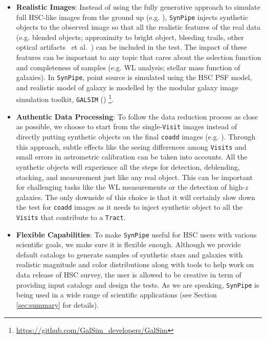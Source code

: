 \documentclass[useamsfonts]{pasj01}
\def\etal{{\ et al.~}}
\def\synpipe{\texttt{SynPipe}}
\def\tract{\texttt{Tract}}
\def\visit{\texttt{Visit}}
\def\visits{\texttt{Visits}}
\def\galsim{\texttt{G}{\scriptsize \texttt{AL}}\texttt{S}{\scriptsize \texttt{IM}}}
\begin{document}
    \begin{itemize}

        \item \textbf{Realistic Images}:
            Instead of using the fully generative approach to simulate full HSC-like
            images from the ground up (e.g. \citealt{Chang2015}), \synpipe{} injects
            synthetic objects to the observed image so that all the realistic
            features of the real data (e.g. blended objects; approximity to bright
            object, bleeding trails, other optical artifacts \etal) can be included
            in the test.
            The impact of these features can be important to any topic that cares
            about the selection function and completeness of samples
            (e.g. WL analysis; stellar mass function of galaxies).
            In \synpipe{}, point source is simulated using the HSC PSF model,
            and realistic model of galaxy is modelled by the modular galaxy image
            simulation toolkit, \galsim{} (\citealt{Rowe2015})
            \footnote{\url{https://github.com/GalSim_developers/GalSim}}.

        \item \textbf{Authentic Data Processing}:
            To follow the data reduction process as close as possible, we choose to
            start from the single-\visit{} images instead of directly putting
            synthetic objects on the final \texttt{coadd} images
            (e.g. \citealt{Suchyta2016}).
            Through this approach, subtle effects like the seeing differences among
            \visits{} and small errors in astrometric calibration can be taken
            into accounts.
            All the synthetic objects will experience all the steps for detection,
            deblending, stacking, and measurement just like any real object.
            This can be important for challenging tasks like the WL measurements
            or the detection of high-$z$ galaxies.
            The only downside of this choice is that it will certainly slow down the
            test for \texttt{coadd} images as it needs to inject synthetic object
            to all the \visits{} that contribute to a \tract{}.

        \item \textbf{Flexible Capabilities}:
            To make \synpipe{} useful for HSC users with various scientific goals,
            we make sure it is flexible enough.
            Although we provide default catalogs to generate samples of synthetic stars
            and galaxies with realistic magnitude and color distributions along with
            tools to help work on data release of HSC survey, the user is allowed to
            be creative in term of providing input catalogs and design the tests.
            As we are speaking, \synpipe{} is being used in a wide range of
            scientific applications (see Section \ref{sec:summary} for details).

    \end{itemize}
\end{document}
